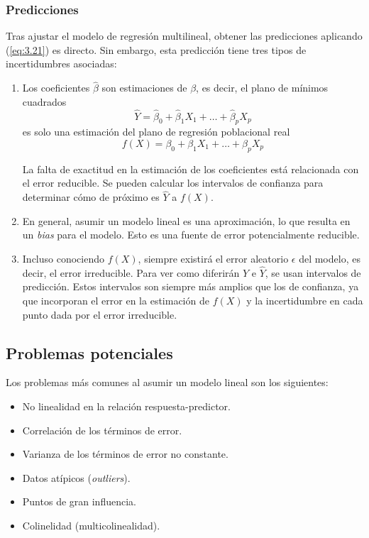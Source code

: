 \subsubsection{Predicciones}

Tras ajustar el modelo de regresión multilineal, obtener las predicciones aplicando (\ref{eq:3.21}) es directo. Sin embargo, esta predicción tiene tres tipos de incertidumbres asociadas:
\begin{enumerate}
\item Los coeficientes $\hat{\beta}$ son estimaciones de $\beta$, es decir, el plano de mínimos cuadrados 
\begin{equation}
\hat{Y} = \hat{\beta}_0 + \hat{\beta}_1 X_1 + \dots + \hat{\beta}_p X_p 
\end{equation}
es solo una estimación del plano de regresión poblacional real
\begin{equation}
f(X) = \beta_0 + \beta_1 X_1 + \dots + \beta_p X_p 
\end{equation}

La falta de exactitud en la estimación de los coeficientes está relacionada con el error reducible. Se pueden calcular los intervalos de confianza para determinar cómo de próximo es $\hat{Y}$ a $f(X)$.
\item En general, asumir un modelo lineal es una aproximación, lo que resulta en un \textit{bias} para el modelo. Esto es una fuente de error potencialmente reducible. 
\item Incluso conociendo $f(X)$, siempre existirá el error aleatorio $\epsilon$ del modelo, es decir, el error irreducible. Para ver como diferirán $Y$ e $\hat{Y}$, se usan intervalos de predicción. Estos intervalos son siempre más amplios que los de confianza, ya que incorporan el error en la estimación de $f(X)$ y la incertidumbre en cada punto dada por el error irreducible.
\end{enumerate}

\subsection{Problemas potenciales}

\noindent Los problemas más comunes al asumir un modelo lineal son los siguientes:
\begin{itemize}
\item No linealidad en la relación respuesta-predictor.
\item Correlación de los términos de error.
\item Varianza de los términos de error no constante.
\item Datos atípicos (\textit{outliers}).
\item Puntos de gran influencia.
\item Colinelidad (multicolinealidad).
\end{itemize}

